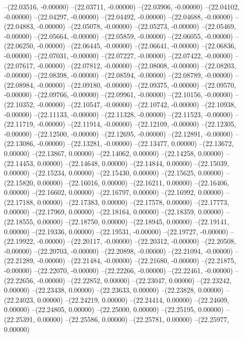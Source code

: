 --(22.03516, -0.00000)
--(22.03711, -0.00000)
--(22.03906, -0.00000)
--(22.04102, -0.00000)
--(22.04297, -0.00000)
--(22.04492, -0.00000)
--(22.04688, -0.00000)
--(22.04883, -0.00000)
--(22.05078, -0.00000)
--(22.05273, -0.00000)
--(22.05469, -0.00000)
--(22.05664, -0.00000)
--(22.05859, -0.00000)
--(22.06055, -0.00000)
--(22.06250, -0.00000)
--(22.06445, -0.00000)
--(22.06641, -0.00000)
--(22.06836, -0.00000)
--(22.07031, -0.00000)
--(22.07227, -0.00000)
--(22.07422, -0.00000)
--(22.07617, -0.00000)
--(22.07812, -0.00000)
--(22.08008, -0.00000)
--(22.08203, -0.00000)
--(22.08398, -0.00000)
--(22.08594, -0.00000)
--(22.08789, -0.00000)
--(22.08984, -0.00000)
--(22.09180, -0.00000)
--(22.09375, -0.00000)
--(22.09570, -0.00000)
--(22.09766, -0.00000)
--(22.09961, -0.00000)
--(22.10156, -0.00000)
--(22.10352, -0.00000)
--(22.10547, -0.00000)
--(22.10742, -0.00000)
--(22.10938, -0.00000)
--(22.11133, -0.00000)
--(22.11328, -0.00000)
--(22.11523, -0.00000)
--(22.11719, -0.00000)
--(22.11914, -0.00000)
--(22.12109, -0.00000)
--(22.12305, -0.00000)
--(22.12500, -0.00000)
--(22.12695, -0.00000)
--(22.12891, -0.00000)
--(22.13086, -0.00000)
--(22.13281, -0.00000)
--(22.13477, 0.00000)
--(22.13672, 0.00000)
--(22.13867, 0.00000)
--(22.14062, 0.00000)
--(22.14258, 0.00000)
--(22.14453, 0.00000)
--(22.14648, 0.00000)
--(22.14844, 0.00000)
--(22.15039, 0.00000)
--(22.15234, 0.00000)
--(22.15430, 0.00000)
--(22.15625, 0.00000)
--(22.15820, 0.00000)
--(22.16016, 0.00000)
--(22.16211, 0.00000)
--(22.16406, 0.00000)
--(22.16602, 0.00000)
--(22.16797, 0.00000)
--(22.16992, 0.00000)
--(22.17188, 0.00000)
--(22.17383, 0.00000)
--(22.17578, 0.00000)
--(22.17773, 0.00000)
--(22.17969, 0.00000)
--(22.18164, 0.00000)
--(22.18359, 0.00000)
--(22.18555, 0.00000)
--(22.18750, 0.00000)
--(22.18945, 0.00000)
--(22.19141, 0.00000)
--(22.19336, 0.00000)
--(22.19531, -0.00000)
--(22.19727, -0.00000)
--(22.19922, -0.00000)
--(22.20117, -0.00000)
--(22.20312, -0.00000)
--(22.20508, -0.00000)
--(22.20703, -0.00000)
--(22.20898, -0.00000)
--(22.21094, -0.00000)
--(22.21289, -0.00000)
--(22.21484, -0.00000)
--(22.21680, -0.00000)
--(22.21875, -0.00000)
--(22.22070, -0.00000)
--(22.22266, -0.00000)
--(22.22461, -0.00000)
--(22.22656, -0.00000)
--(22.22852, 0.00000)
--(22.23047, 0.00000)
--(22.23242, 0.00000)
--(22.23438, 0.00000)
--(22.23633, 0.00000)
--(22.23828, 0.00000)
--(22.24023, 0.00000)
--(22.24219, 0.00000)
--(22.24414, 0.00000)
--(22.24609, 0.00000)
--(22.24805, 0.00000)
--(22.25000, 0.00000)
--(22.25195, 0.00000)
--(22.25391, 0.00000)
--(22.25586, 0.00000)
--(22.25781, 0.00000)
--(22.25977, 0.00000)
